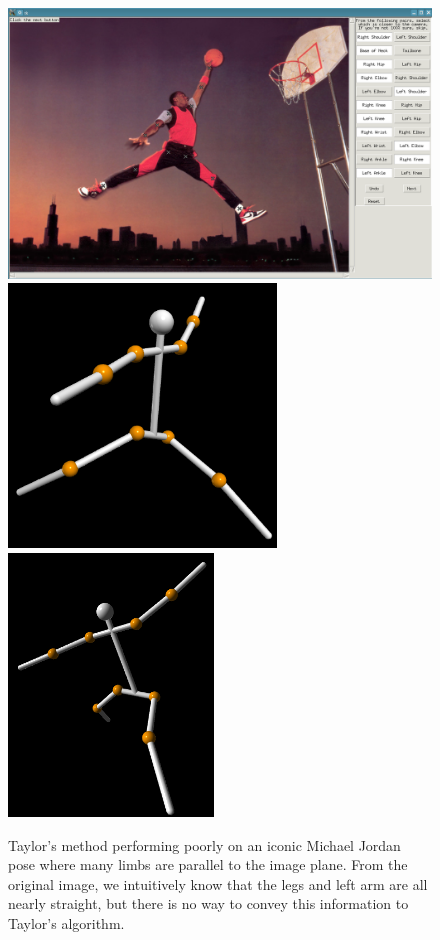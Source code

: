 \documentclass[final]{article}
\begin{document}
\begin{spacing}{1.1}
\begin{figure}[h]
  \centering
  \includegraphics[width=12cm]{fig/jordangui.png}
  \includegraphics[height=7cm]{fig/jordanrecons.png}
  \includegraphics[height=7cm]{fig/jordanrecons2.png}
  \caption{Taylor's method performing poorly on an iconic Michael Jordan pose where many limbs are parallel to the image plane. From the original image, we intuitively know that the legs and left arm are all nearly straight, but there is no way to convey this information to Taylor's algorithm.}
  \label{fig:jordangui}
\end{figure}


\end{spacing}
\end{document}
